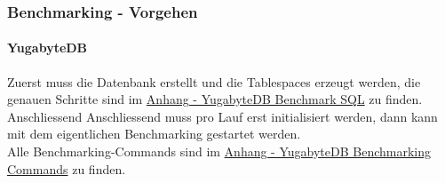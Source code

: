 
\begin{flushleft}
    \subsubsection{Benchmarking - Vorgehen}
    \paragraph{YugabyteDB}
    Zuerst muss die Datenbank erstellt und die Tablespaces erzeugt werden, die genauen Schritte sind im \hyperref[subsubsec:yugabytedb_benchmarking_sql]{Anhang - YugabyteDB Benchmark SQL} zu finden.\\    Anschliessend
    Anschliessend muss pro Lauf erst initialisiert werden, dann kann mit dem eigentlichen Benchmarking gestartet werden.\\
    Alle Benchmarking-Commands sind im \hyperref[subsec:yugabytedb_benchmarking_commands]{Anhang - YugabyteDB Benchmarking Commands} zu finden.

\end{flushleft}
